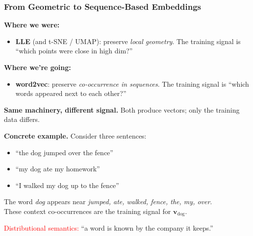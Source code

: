 \documentclass[notes,11pt, aspectratio=169]{beamer}
\newcommand{\vv}{\mathbf{v}}
\begin{document}
\begin{frame}
\frametitle{From Geometric to Sequence-Based Embeddings}

\textbf{Where we were:}
\begin{itemize}
    \item \textbf{LLE} (and t-SNE / UMAP): preserve \emph{local geometry}. The training signal is ``which points were close in high dim?''
\end{itemize}

\vspace{6pt}
\textbf{Where we're going:}
\begin{itemize}
    \item \textbf{word2vec}: preserve \emph{co-occurrence in sequences}. The training signal is ``which words appeared next to each other?''
\end{itemize}

\vspace{8pt}
\textbf{Same machinery, different signal.} Both produce vectors; only the training data differs.

\vspace{8pt}
\textbf{Concrete example.} Consider three sentences:
\begin{itemize}
    \item ``the dog jumped over the fence''
    \item ``my dog ate my homework''
    \item ``I walked my dog up to the fence''
\end{itemize}

\vspace{4pt}
The word \textit{dog} appears near \textit{jumped, ate, walked, fence, the, my, over}. \\
These context co-occurrences are the training signal for $\vv_\text{dog}$.

\vspace{4pt}
\textcolor{red}{Distributional semantics:} ``a word is known by the company it keeps.''
\end{frame}
\end{document}
